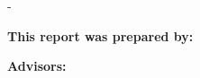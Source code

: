 \begin{titlingpage}
 
\thispagestyle{empty}
 \calccentering{\unitlength}
 \begin{adjustwidth*}{\unitlength}{-\unitlength}
  \textbf{\ThTitleEN}

  \noindent\textbf{This report was prepared by:}\\
  \ThAuthors
  

  \noindent\textbf{Advisors:}\\
  \ThSupervisors
  

  \noindent\ThDepartment
  
  
  \noindent\ThElektroEmail
  
  

 \end{adjustwidth*}
\end{titlingpage}